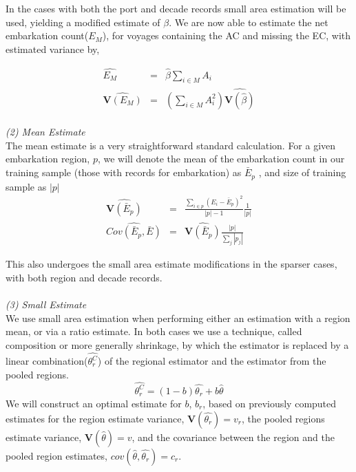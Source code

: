 \documentclass[preprint,12pt]{elsarticle}
\begin{document}
In the cases with both the port and decade records small area
estimation will be used, yielding a modified estimate of $\beta$.
We are now able to estimate the net embarkation count($E_M$), for voyages containing the AC and
missing the EC, with estimated variance by,

\begin{eqnarray}
\hat{E_M} &=& \hat{\beta} \sum_{i \in M} A_i\\
\widehat{\mathbf{V}(E_M)} &=& ( \sum_{i \in M} A_i^2 ) \widehat{\mathbf{V}(\hat{\beta})}
\end{eqnarray}
\\
\textit{(2) Mean Estimate}\\
\indent
The mean estimate is a very straightforward standard calculation.  For a given embarkation region, $p$, we will denote the mean of the embarkation count in our training sample (those with  records for
embarkation) as $\bar{E}_p$ , and size of training sample as  $|p|$
\begin{eqnarray}
\widehat{\mathbf{V}(\bar{E}_p)} &=& \frac{\sum_{i \in p} (E_i - \bar{E}_p)^2}{|p|-1} \frac{1}{|p|}\\
\widehat{Cov(\bar{E}_p,\bar{E})} &=& \widehat{\mathbf{V}(\bar{E}_p)} \frac{|p|}{\sum_j |p_j|}
\end{eqnarray}
 
This also undergoes the small area estimate modifications in the
sparser cases, with both region and decade records.\\ 
\\
\textit{(3) Small Estimate}\\
\indent
We use small area estimation when performing either an estimation with
a region mean, or via a ratio estimate.
In both cases we use a technique, called composition or more generally shrinkage, by which the estimator is replaced by
a linear combination($\hat{\theta_r^C}$) of the regional estimator and the estimator from
the pooled regions.  
\begin{equation}
\hat{\theta_r^C} = (1 - b)\hat{\theta_r} + b \hat{\theta}
\end{equation}
\indent
We will construct an optimal estimate for $b$, $b_r$, based on
previously computed estimates for
the region estimate variance, $\mathbf{V}(\hat{\theta_r}) = v_r$, the pooled
regions estimate variance, $\mathbf{V}(\hat{\theta}) = v$, and the
covariance between the region and the pooled region estimates,
$cov(\hat{\theta},\hat{\theta_r}) = c_r$. 
\end{document}
